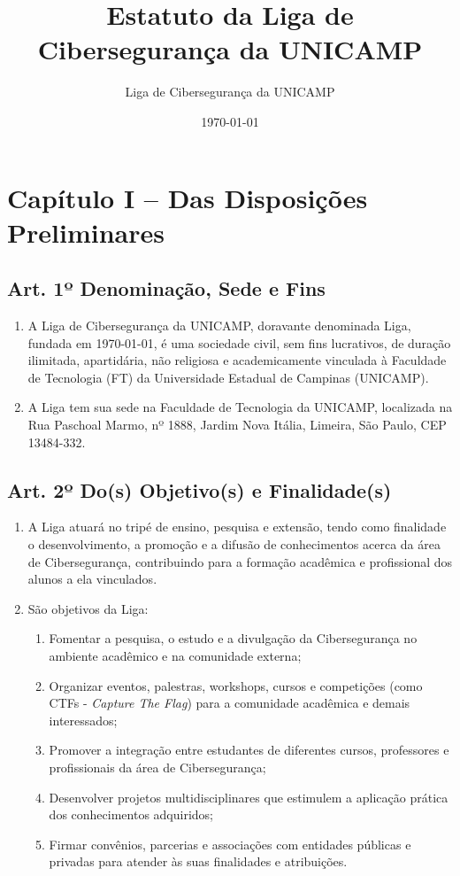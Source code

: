 \documentclass[12pt, a4paper]{article}
\title{Estatuto da Liga de Cibersegurança da UNICAMP}
\author{Liga de Cibersegurança da UNICAMP}
\date{\today}
\begin{document}
\maketitle
\thispagestyle{empty}
\newpage

\tableofcontents
\newpage

\section{Capítulo I – Das Disposições Preliminares}


\subsection{Art. 1º Denominação, Sede e Fins}
\begin{enumerate}[label=\S \arabic*.]
    \item A Liga de Cibersegurança da UNICAMP, doravante denominada Liga, fundada em \today, é uma sociedade civil, sem fins lucrativos, de duração ilimitada, apartidária, não religiosa e academicamente vinculada à Faculdade de Tecnologia (FT) da Universidade Estadual de Campinas (UNICAMP).
    \item A Liga tem sua sede na Faculdade de Tecnologia da UNICAMP, localizada na Rua Paschoal Marmo, nº 1888, Jardim Nova Itália, Limeira, São Paulo, CEP 13484-332.
\end{enumerate}

\subsection{Art. 2º Do(s) Objetivo(s) e Finalidade(s)}
\begin{enumerate}[label=\S \arabic*.]
    \item A Liga atuará no tripé de ensino, pesquisa e extensão, tendo como finalidade o desenvolvimento, a promoção e a difusão de conhecimentos acerca da área de Cibersegurança, contribuindo para a formação acadêmica e profissional dos alunos a ela vinculados.
    \item São objetivos da Liga:
    \begin{enumerate}[label=\alph*)]
        \item Fomentar a pesquisa, o estudo e a divulgação da Cibersegurança no ambiente acadêmico e na comunidade externa;
        \item Organizar eventos, palestras, workshops, cursos e competições (como CTFs - \textit{Capture The Flag}) para a comunidade acadêmica e demais interessados;
        \item Promover a integração entre estudantes de diferentes cursos, professores e profissionais da área de Cibersegurança;
        \item Desenvolver projetos multidisciplinares que estimulem a aplicação prática dos conhecimentos adquiridos;
        \item Firmar convênios, parcerias e associações com entidades públicas e privadas para atender às suas finalidades e atribuições.
    \end{enumerate}
\end{enumerate}
\end{document}
